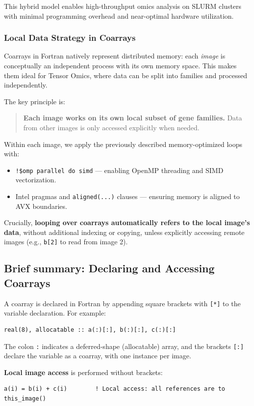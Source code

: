 \documentclass{article}
\begin{document}
This hybrid model enables high-throughput omics analysis on SLURM clusters with minimal programming overhead and near-optimal hardware utilization.

\subsubsection{Local Data Strategy in Coarrays}
Coarrays in Fortran natively represent distributed memory: each \emph{image} is conceptually an independent process with its own memory space. This makes them ideal for Tensor Omics, where data can be split into families and processed independently. 

The key principle is:
\begin{quote}
\textbf{Each image works on its own local subset of gene families.} Data from other images is only accessed explicitly when needed.
\end{quote}

Within each image, we apply the previously described memory-optimized loops with:
\begin{itemize}
\item \texttt{!\$omp parallel do simd} — enabling OpenMP threading and SIMD vectorization.
\item Intel pragmas and \texttt{aligned(...)} clauses — ensuring memory is aligned to AVX boundaries.
\end{itemize}

Crucially, \textbf{looping over coarrays automatically refers to the local image's data}, without additional indexing or copying, unless explicitly accessing remote images (e.g., \texttt{b[2]} to read from image 2).

\subsection{Brief summary: Declaring and Accessing Coarrays}

A coarray is declared in Fortran by appending square brackets with \texttt{[*]} to the variable declaration. For example:

\begin{verbatim}
real(8), allocatable :: a(:)[:], b(:)[:], c(:)[:]
\end{verbatim}

The colon \texttt{:} indicates a deferred-shape (allocatable) array, and the brackets \texttt{[:]} declare the variable as a coarray, with one instance per image.

\textbf{Local image access} is performed without brackets:
\begin{verbatim}
a(i) = b(i) + c(i)        ! Local access: all references are to this_image()
\end{verbatim}
\end{document}
